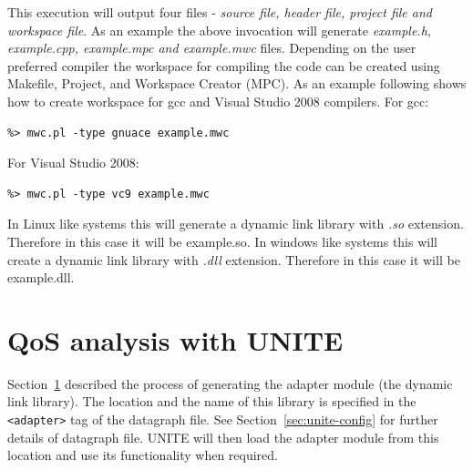 This execution will output four files - \textit{source file, header file, 
project file and workspace file}. As an example the above invocation 
will generate \textit{example.h, example.cpp, example.mpc and example.mwc} 
files. Depending on the user preferred compiler the workspace for compiling 
the code can be created using Makefile, Project, and Workspace Creator (MPC).
As an example following shows how to create workspace for gcc and Visual 
Studio 2008 compilers.
For gcc:
\begin{lstlisting}
%> mwc.pl -type gnuace example.mwc
\end{lstlisting}

For Visual Studio 2008:
\begin{lstlisting}
%> mwc.pl -type vc9 example.mwc
\end{lstlisting}

In Linux like systems this will generate a dynamic link library with \textit{.so} extension.
Therefore in this case it will be example.so. In windows like systems this will create 
a dynamic link library with \textit{.dll} extension. Therefore in this case it 
will be example.dll.  

\section{QoS analysis with UNITE}
\label{sec:qos-analysis}

Section~\ref{sec:qos-analysis} described the process of generating the 
adapter module (the dynamic link library). The location and the name 
of this library is specified in the \texttt{<adapter>} tag of the datagraph 
file. See Section~\ref{sec:unite-config} for further details of datagraph 
file. UNITE will then load the adapter module from this location and 
use its functionality when required.